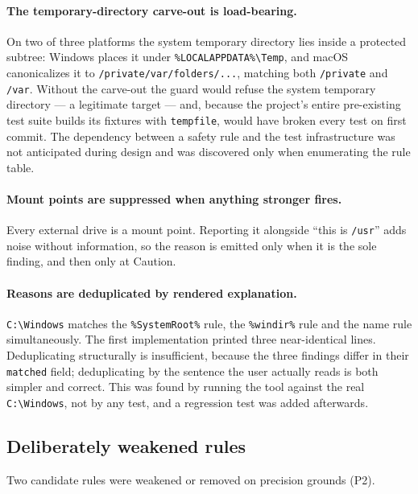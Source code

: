 \documentclass[11pt,a4paper]{article}
\newcommand{\code}[1]{\texttt{\small #1}}
\begin{document}
\paragraph{The temporary-directory carve-out is load-bearing.}
On two of three platforms the system temporary directory lies inside a protected
subtree: Windows places it under \code{\%LOCALAPPDATA\%\textbackslash Temp}, and macOS
canonicalizes it to \code{/private/var/folders/...}, matching both \code{/private} and
\code{/var}. Without the carve-out the guard would refuse the system temporary
directory --- a legitimate target --- and, because the project's entire pre-existing
test suite builds its fixtures with \code{tempfile}, would have broken every test on
first commit. The dependency between a safety rule and the test infrastructure was not
anticipated during design and was discovered only when enumerating the rule table.

\paragraph{Mount points are suppressed when anything stronger fires.}
Every external drive is a mount point. Reporting it alongside \enquote{this is
\code{/usr}} adds noise without information, so the reason is emitted only when it is
the sole finding, and then only at \textsf{Caution}.

\paragraph{Reasons are deduplicated by rendered explanation.}
\code{C:\textbackslash Windows} matches the \code{\%SystemRoot\%} rule, the \code{\%windir\%} rule and
the name rule simultaneously. The first implementation printed three near-identical
lines. Deduplicating structurally is insufficient, because the three findings differ
in their \code{matched} field; deduplicating by the sentence the user actually reads
is both simpler and correct. This was found by running the tool against the real
\code{C:\textbackslash Windows}, not by any test, and a regression test was added afterwards.

\subsection{Deliberately weakened rules}
\label{sec:detect:weak}

Two candidate rules were weakened or removed on precision grounds (P2).
\end{document}
